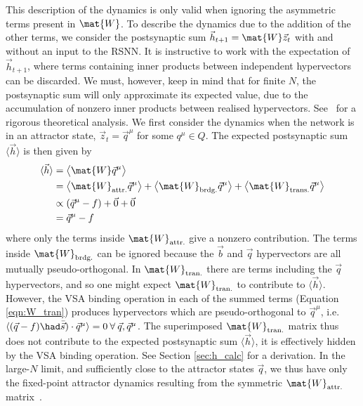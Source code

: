 This description of the dynamics is only valid when ignoring the asymmetric terms present in $\mat{W}$. To describe the dynamics due to the addition of the other terms, we consider the postsynaptic sum $\vec{h}_{t+1}  = \mat{W}\vec{z}_t$ with and without an input to the RSNN. It is instructive to work with the expectation of $\vec{h}_{t+1}$, where terms containing inner products between independent hypervectors can be discarded. We must, however, keep in mind that for finite $N$, the postsynaptic sum will only approximate its expected value, due to the accumulation of nonzero inner products between realised hypervectors. See~\cite{thomas_theoretical_2022, clarkson_capacity_2023} for a rigorous theoretical analysis. We first consider the dynamics when the network is in an attractor state, $\vec{z}_t = \vec{q}^\mu$ for some $q^\mu \in Q$. The expected postsynaptic sum $\langle \vec{h} \rangle$ is then given by
\begin{equation}
\begin{split}
\langle \vec{h} \rangle & = \bigl \langle \mat{W} \vec{q}^\mu\bigr \rangle \\
& =  \bigl \langle \mat{W}_\text{attr.} \vec{q}^\mu\bigr \rangle + \bigl \langle \mat{W}_\text{brdg.} \vec{q}^\mu\bigr \rangle+ \bigl \langle \mat{W}_\text{trans.} \vec{q}^\mu\bigr \rangle  \\
& \propto (\vec{q}^\mu - f) + \vec{0} + \vec{0} \\
& = \vec{q}^\mu - f
\end{split}
\label{eqn:mean_h_attr}
\end{equation}
where only the terms inside $\mat{W}_\text{attr.}$ give a nonzero contribution. The terms inside $\mat{W}_\text{brdg.}$ can be ignored because the $\vec{b}$ and $\vec{q}$ hypervectors are all mutually pseudo-orthogonal. In $\mat{W}_\text{tran.}$ there are terms including the $\vec{q}$ hypervectors, and so one might expect $\mat{W}_\text{tran.}$ to contribute to $\langle \vec{h} \rangle$. However, the VSA binding operation in each of the summed terms (Equation \ref{eqn:W_tran}) produces hypervectors which are pseudo-orthogonal to $\vec{q}^\mu$, i.e. $\langle (\vec{q}  - f) \had \bar{\vec{s}}) \cdot \vec{q}^\mu \rangle = 0 \:  \forall \: \vec{q}, \vec{q}^\mu$. The superimposed $\mat{W}_\text{tran.}$ matrix thus does not contribute to the expected postsynaptic sum $\langle \vec{h} \rangle$, it is effectively hidden by the VSA binding operation. See Section \ref{sec:h_calc} for a derivation.
In the large-$N$ limit, and sufficiently close to the attractor states $\vec{q}$, we thus have only the fixed-point attractor dynamics resulting from the symmetric $\mat{W}_\text{attr.}$ matrix~\cite{tsodyks_enhanced_1988, amari_characteristics_1989}.


